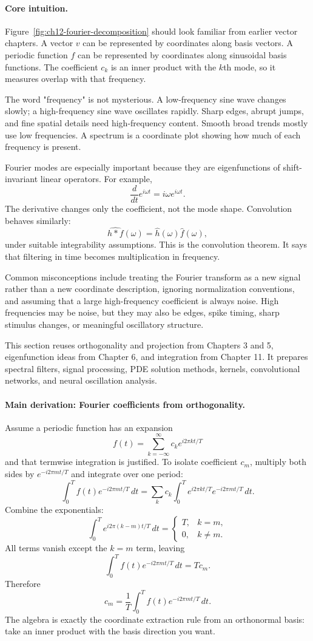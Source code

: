 \paragraph{Core intuition.}
Figure~\ref{fig:ch12-fourier-decomposition} should look familiar from earlier vector chapters. A vector \(v\) can be represented by coordinates along basis vectors. A periodic function \(f\) can be represented by coordinates along sinusoidal basis functions. The coefficient \(c_k\) is an inner product with the \(k\)th mode, so it measures overlap with that frequency.

The word "frequency" is not mysterious. A low-frequency sine wave changes slowly; a high-frequency sine wave oscillates rapidly. Sharp edges, abrupt jumps, and fine spatial details need high-frequency content. Smooth broad trends mostly use low frequencies. A spectrum is a coordinate plot showing how much of each frequency is present.

Fourier modes are especially important because they are eigenfunctions of shift-invariant linear operators. For example,
\[
\frac{d}{dt}e^{i\omega t}=i\omega e^{i\omega t}.
\]
The derivative changes only the coefficient, not the mode shape. Convolution behaves similarly:
\[
\widehat{h*f}(\omega)=\widehat h(\omega)\widehat f(\omega),
\]
under suitable integrability assumptions. This is the convolution theorem. It says that filtering in time becomes multiplication in frequency.

Common misconceptions include treating the Fourier transform as a new signal rather than a new coordinate description, ignoring normalization conventions, and assuming that a large high-frequency coefficient is always noise. High frequencies may be noise, but they may also be edges, spike timing, sharp stimulus changes, or meaningful oscillatory structure.

This section reuses orthogonality and projection from Chapters 3 and 5, eigenfunction ideas from Chapter 6, and integration from Chapter 11. It prepares spectral filters, signal processing, PDE solution methods, kernels, convolutional networks, and neural oscillation analysis.

\paragraph{Main derivation: Fourier coefficients from orthogonality.}
Assume a periodic function has an expansion
\[
f(t)=\sum_{k=-\infty}^{\infty} c_k e^{i2\pi kt/T}
\]
and that termwise integration is justified. To isolate coefficient \(c_m\), multiply both sides by \(e^{-i2\pi mt/T}\) and integrate over one period:
\[
\int_0^T f(t)e^{-i2\pi mt/T}\,dt
=
\sum_k c_k\int_0^T e^{i2\pi kt/T}e^{-i2\pi mt/T}\,dt.
\]
Combine the exponentials:
\[
\int_0^T e^{i2\pi(k-m)t/T}\,dt
=
\begin{cases}
T, & k=m,\\
0, & k\neq m.
\end{cases}
\]
All terms vanish except the \(k=m\) term, leaving
\[
\int_0^T f(t)e^{-i2\pi mt/T}\,dt
=Tc_m.
\]
Therefore
\[
c_m=\frac{1}{T}\int_0^T f(t)e^{-i2\pi mt/T}\,dt.
\]
The algebra is exactly the coordinate extraction rule from an orthonormal basis: take an inner product with the basis direction you want.

